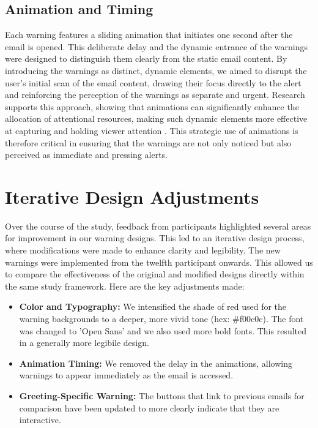 \documentclass[
  a4paper,  %
  twoside,  %
  bibliography=totoc,
  headsepline,
  cleardoublepage=empty,
  parskip=half,
  draft=false
]{scrbook}
\begin{document}
\subsection{Animation and Timing}
Each warning features a sliding animation that initiates one second after the email is opened. This deliberate delay and the dynamic entrance of the warnings were designed to distinguish them clearly from the static email content. By introducing the warnings as distinct, dynamic elements, we aimed to disrupt the user's initial scan of the email content, drawing their focus directly to the alert and reinforcing the perception of the warnings as separate and urgent. Research supports this approach, showing that animations can significantly enhance the allocation of attentional resources, making such dynamic elements more effective at capturing and holding viewer attention \cite{muller}. This strategic use of animations is therefore critical in ensuring that the warnings are not only noticed but also perceived as immediate and pressing alerts.

\section{Iterative Design Adjustments}
\label{adjust}
Over the course of the study, feedback from participants highlighted several areas for improvement in our warning designs. This led to an iterative design process, where modifications were made to enhance clarity and legibility. The new warnings were implemented from the twelfth participant onwards. This allowed us to compare the effectiveness of the original and modified designs directly within the same study framework. Here are the key adjustments made:

\begin{itemize}
    \item \textbf{Color and Typography:} We intensified the shade of red used for the warning backgrounds to a deeper, more vivid tone (hex: \#f00c0c). The font was changed to 'Open Sans' and we also used more bold fonts. This resulted in a generally more legibile design.
    \item \textbf{Animation Timing:} We removed the delay in the animations, allowing warnings to appear immediately as the email is accessed.
    \item \textbf{Greeting-Specific Warning:} 
    The buttons that link to previous emails for comparison have been updated to more clearly indicate that they are interactive.
\end{itemize}
\end{document}
